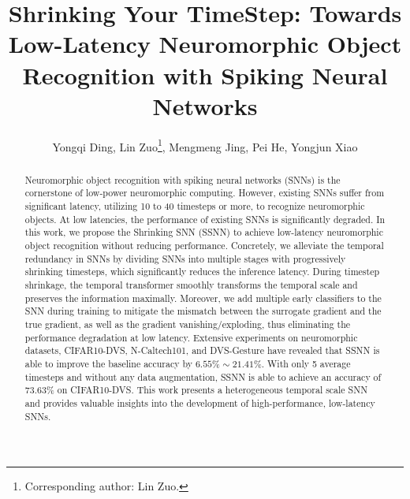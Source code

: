 \documentclass[letterpaper]{article} %
\title{Shrinking Your TimeStep: Towards Low-Latency Neuromorphic Object Recognition with Spiking Neural Networks}
\author{
    Yongqi Ding,
    Lin Zuo\thanks{Corresponding author: Lin Zuo.},
    Mengmeng Jing,
    Pei He,
    Yongjun Xiao
}
\begin{document}
\maketitle
\begin{abstract}
Neuromorphic object recognition with spiking neural networks (SNNs) is the cornerstone of low-power neuromorphic computing. However, existing SNNs suffer from significant latency, utilizing 10 to 40 timesteps or more, to recognize neuromorphic objects. At low latencies, the performance of existing SNNs is significantly degraded. In this work, we propose the Shrinking SNN (SSNN) to achieve low-latency neuromorphic object recognition without reducing performance. Concretely, we alleviate the temporal redundancy in SNNs by dividing SNNs into multiple stages with progressively shrinking timesteps, which significantly reduces the inference latency. During timestep shrinkage, the temporal transformer smoothly transforms the temporal scale and preserves the information maximally. Moreover, we add multiple early classifiers to the SNN during training to mitigate the mismatch between the surrogate gradient and the true gradient, as well as the gradient vanishing/exploding, thus eliminating the performance degradation at low latency. Extensive experiments on neuromorphic datasets, CIFAR10-DVS, N-Caltech101, and DVS-Gesture have revealed that SSNN is able to improve the baseline accuracy by $6.55\%\sim21.41\%$. With only 5 average timesteps and without any data augmentation, SSNN is able to achieve an accuracy of 73.63\% on CIFAR10-DVS. This work presents a heterogeneous temporal scale SNN and provides valuable insights into the development of high-performance, low-latency SNNs.
\end{abstract}
\end{document}
